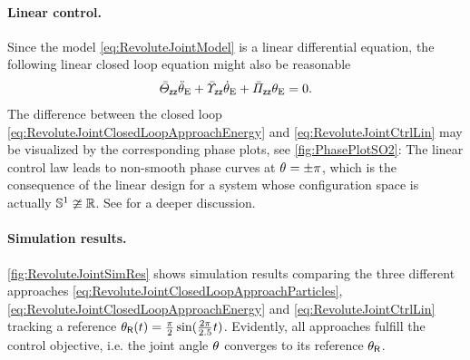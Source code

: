 \paragraph{Linear control.}
Since the model \eqref{eq:RevoluteJointModel} is a linear differential equation, the following linear closed loop equation might also be reasonable
\begin{align}\label{eq:RevoluteJointCtrlLin}
 \bar{\varTheta}_{\mathsf{z}\mathsf{z}} \ddot{\theta}_{\mathrm{E}} + \bar{\varUpsilon}_{\mathsf{z}\mathsf{z}} \dot{\theta}_{\mathrm{E}} + \bar{\varPi}_{\mathsf{z}\mathsf{z}} \theta_{\mathrm{E}} = 0.
\end{align}
The difference between the closed loop \eqref{eq:RevoluteJointClosedLoopApproachEnergy} and \eqref{eq:RevoluteJointCtrlLin} may be visualized by the corresponding phase plots, see \autoref{fig:PhasePlotSO2}:
The linear control law leads to non-smooth phase curves at $\theta_{} = \pm\pi$, which is the consequence of the linear design for a system whose configuration space is actually $\mathbb{S}^1 \ncong \mathbb{R}$.
See \cite[sec.\ 1.2]{Konz:AT} for a deeper discussion.


\paragraph{Simulation results.}
\autoref{fig:RevoluteJointSimRes} shows simulation results comparing the three different approaches \eqref{eq:RevoluteJointClosedLoopApproachParticles}, \eqref{eq:RevoluteJointClosedLoopApproachEnergy} and \eqref{eq:RevoluteJointCtrlLin} tracking a reference $\theta_{\mathsf{R}}(t) = \tfrac{\pi}{2}\sin(\tfrac{2\pi}{2.5}t)$.
Evidently, all approaches fulfill the control objective, i.e. the joint angle $\theta_{}$ converges to its reference $\theta_{\mathsf{R}}$.

